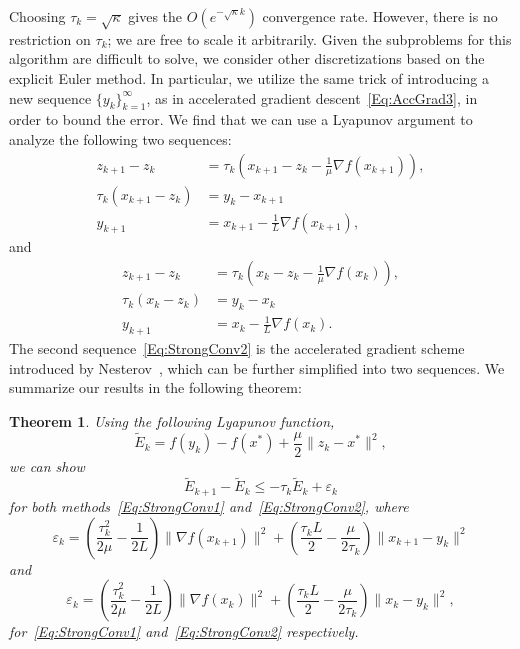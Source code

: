 \documentclass[11pt]{article}
\theoremstyle{plain}
\newtheorem{theorem}{Theorem}
\begin{document}
\noindent Choosing $\tau_k = \sqrt{\kappa}$ gives the $O(e^{-\sqrt{\kappa} k})$ convergence rate. However, there is no restriction on $\tau_k$;  we are free to scale it arbitrarily. Given the subproblems for this algorithm are difficult to solve, we consider other discretizations based on the explicit Euler method. In particular, we utilize the same trick of introducing a new sequence $\{y_k\}_{k=1}^\infty$, as in accelerated gradient descent~\eqref{Eq:AccGrad3},  in order to bound the error. We find that we can use a Lyapunov argument to analyze the following two sequences: 
\begin{subequations}\label{Eq:StrongConv1}
\begin{align} 
z_{k+1} - z_k &= \tau_k \left( x_{k+1} - z_k - \frac{1}{\mu} \nabla f(x_{k+1})\right), \label{Eq:ZSeq2}\\
\tau_k(x_{k+1} - z_k) &= y_k - x_{k+1} \label{Eq:Coupling2}\\
y_{k+1} &= x_{k+1} - \frac{1}{L} \nabla f(x_{k+1}),\label{Eq:Grad2}
\end{align}
\end{subequations}
and 
\begin{subequations}\label{Eq:StrongConv2}
\begin{align}
z_{k+1} - z_k &= \tau_k \left( x_k - z_k - \frac{1}{\mu} \nabla f(x_k)\right), \label{Eq:ZSeq1}\\
\tau_k(x_k - z_k) &= y_k - x_k\label{Eq:Coupling1}\\
y_{k+1} &= x_k - \frac{1}{L} \nabla f(x_k). \label{Eq:Grad1}
\end{align}
\end{subequations}
The second sequence~\eqref{Eq:StrongConv2} is the accelerated gradient scheme introduced by Nesterov~\cite[(2.2.8)]{Nesterov04}, which can be further simplified into two sequences. We summarize our results in the following theorem:
\begin{theorem}Using the following Lyapunov function, 
\begin{equation}\label{Eq:LyapStrong}
\tilde E_k = f(y_k) - f(x^\ast) + \frac{\mu}{2}\|z_k - x^\ast\|^2,
\end{equation}
we can show 
\begin{equation}
\tilde E_{k+1} -\tilde  E_k \leq -\tau_k \tilde E_k + \varepsilon_k
\end{equation}
for both methods~\eqref{Eq:StrongConv1} and~\eqref{Eq:StrongConv2}, where
\begin{equation}
\varepsilon_k = \left(\frac{\tau_k^2}{2\mu} - \frac{1}{2L}\right)\|\nabla f(x_{k+1})\|^2 + \left(\frac{\tau_kL}{2}-\frac{\mu}{2\tau_k}\right)\|x_{k+1} - y_k\|^2
\end{equation}
 and 
\begin{equation}
\varepsilon_k = \left(\frac{\tau_k^2}{2\mu} - \frac{1}{2L}\right)\|\nabla f(x_k)\|^2 + \left(\frac{\tau_kL}{2}-\frac{\mu}{2\tau_k}\right)\|x_k - y_k\|^2,
\end{equation}
for~\eqref{Eq:StrongConv1} and~\eqref{Eq:StrongConv2} respectively.
\end{theorem}
\end{document}
